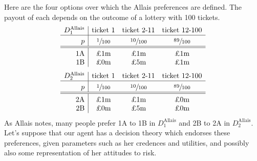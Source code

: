 \documentclass[a4paper,final]{article}
\newcommand\Tstrut{\rule{0pt}{2.6ex}}       %
\newcommand\Bstrut{\rule[-0.9ex]{0pt}{0pt}} %
\renewcommand{\color}[1]{}
\newenvironment{CCM rewritten}
{\begingroup\color{blue}} %
{\endgroup}              %
\begin{document}
%
Here are the four options over which the Allais preferences are defined. The payout of each depends on the outcome of a lottery with 100 tickets. 
%	
$$
\begin{array}{r|ccc}
	D^{\mathrm{Allais}}_1 & \text{ticket 1} &\text{ticket 2-11}& \text{ticket 12-100}\Bstrut \\\hline \Tstrut	p & \sfrac{1}{100} & \sfrac{10}{100} & \sfrac{89}{100} \Bstrut \\\hline \hline\Tstrut 
	\text{1A} & \text{\pounds 1m} & \text{\pounds 1m}  & \text{\pounds 1m} \\
	\text{1B} & \text{\pounds 0m} & \text{\pounds 5m}  & \text{\pounds 1m}
\end{array}
$$$$
\begin{array}{r|ccc}
	D^{\mathrm{Allais}}_2 & \text{ticket 1} &\text{ticket 2-11}& \text{ticket 12-100}\Bstrut \\\hline \Tstrut	p & \sfrac{1}{100} & \sfrac{10}{100} & \sfrac{89}{100} \Bstrut \\\hline \hline\Tstrut 
	\text{2A} & \text{\pounds 1m} & \text{\pounds 1m}  & \text{\pounds 0m} \\
	\text{2B} & \text{\pounds 0m} & \text{\pounds 5m}  & \text{\pounds 0m} 
\end{array}
$$
As Allais notes, many people prefer 1A to 1B in $D^{\mathrm{Allais}}_1$ and 2B to 2A in $D^{\mathrm{Allais}}_2$.
Let's suppose that our agent has a decision theory which endorses these preferences, given parameters such as her credences and utilities, and possibly also some representation of her attitudes to risk.

\end{document}
